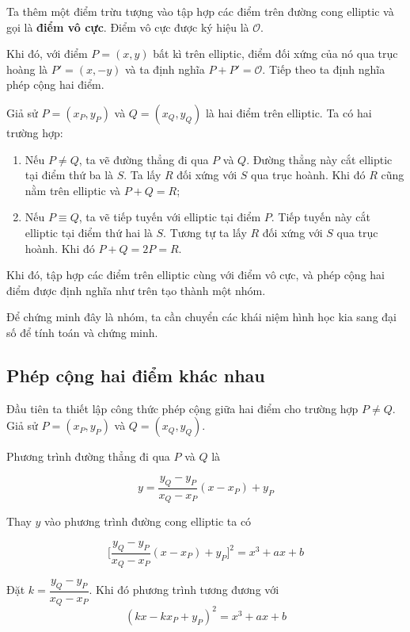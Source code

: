 Ta thêm một điểm trừu tượng vào tập hợp các điểm trên đường cong
elliptic và gọi là \textbf{điểm vô cực}. Điểm vô cực được ký hiệu là
$\mathcal{O}$.

Khi đó, với điểm $P=(x, y)$ bất kì trên elliptic, điểm đối xứng của
nó qua trục hoàng là $P'=(x,-y)$ và ta định nghĩa $P + P'=\mathcal{O}$.
Tiếp theo ta định nghĩa phép cộng hai điểm.

Giả sử $P=(x_P, y_P)$ và $Q=(x_Q, y_Q)$ là hai điểm trên elliptic.
Ta có hai trường hợp:

\begin{enumerate}
    \item Nếu $P \neq Q$, ta vẽ đường thẳng đi qua $P$ và $Q$. Đường thẳng
    này cắt elliptic tại điểm thứ ba là $S$. Ta lấy $R$ đối xứng với $S$ qua
    trục hoành. Khi đó $R$ cũng nằm trên elliptic và $P + Q = R$;
    \item Nếu $P \equiv Q$, ta vẽ tiếp tuyến với elliptic tại điểm $P$.
    Tiếp tuyến này cắt elliptic tại điểm thứ hai là $S$. Tương tự ta lấy
    $R$ đối xứng với $S$ qua trục hoành. Khi đó $P + Q = 2P = R$.
\end{enumerate}

Khi đó, tập hợp các điểm trên elliptic cùng với điểm vô cực, và phép
cộng hai điểm được định nghĩa như trên tạo thành một nhóm.

Để chứng minh đây là nhóm, ta cần chuyển các khái niệm hình học kia
sang đại số để tính toán và chứng minh.

\subsection*{Phép cộng hai điểm khác nhau}

Đầu tiên ta thiết lập công thức phép cộng giữa hai điểm cho trường 
hợp $P \neq Q$. Giả sử $P = (x_P, y_P)$ và $Q = (x_Q, y_Q)$.

Phương trình đường thẳng đi qua $P$ và $Q$ là

\begin{equation}
    \label{eqecc:1}
    y = \frac{y_Q - y_P}{x_Q - x_P} (x - x_P) + y_P
\end{equation}

Thay $y$ vào phương trình đường cong elliptic ta có

\begin{equation}
    \label{eqecc:2}
    \Big[\frac{y_Q - y_P}{x_Q - x_P} (x - x_P) + y_P\Big]^2 = x^3 + ax + b
\end{equation}

Đặt $k = \dfrac{y_Q - y_P}{x_Q - x_P}$. Khi đó phương trình tương đương
với 
\[(k x - k x_P + y_P)^2 = x^3 + ax + b\]

